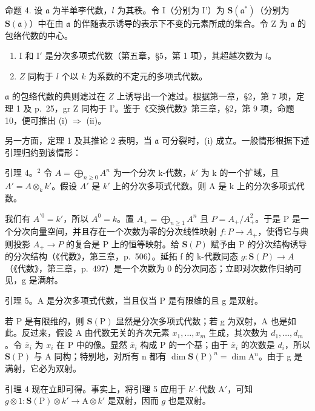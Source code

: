命题 4. 设 \(\mathfrak{a}\) 为半单李代数，\(l\) 为其秩。令 I（分别为 I'）为 \(\mathbf{S}(\mathfrak{a}^{*})\)（分别为 \(\mathbf{S}(\mathfrak{a})\)）中在由 \(\mathfrak{a}\) 的伴随表示诱导的表示下不变的元素所成的集合。令 Z 为 \(\mathfrak{a}\) 的包络代数的中心。

\begin{enumerate}
\def\labelenumi{(\roman{enumi})}
\item
  I 和 \(\mathrm{I}'\) 是分次多项式代数（第五章，§5，第 1 项），其超越次数为 \(l\)。
\item
  \(Z\) 同构于 \(l\) 个以 \(k\) 为系数的不定元的多项式代数。
\end{enumerate}

\(\mathfrak{a}\) 的包络代数的典则滤过在 \(Z\) 上诱导出一个滤过。根据第一章，§2，第 7 项，定理 1 及 p.~25，gr Z 同构于 I'。鉴于《交换代数》第三章，§2，第 9 项，命题 10，便可推出 (i) \(\Longrightarrow\) (ii)。

另一方面，定理 1 及其推论 2 表明，当 \(\mathfrak{a}\) 可分裂时，(i) 成立。一般情形根据下述引理归约到该情形：

引理 4。\(^{2}\) 令 \(A = \bigoplus_{n \geq 0} A^{n}\) 为一个分次 k-代数，\(k'\) 为 k 的一个扩域，且 \(A' = A \otimes_{k} k'\)。假设 \(A'\) 是 \(k'\) 上的分次多项式代数。则 A 是 k 上的分次多项式代数。

我们有 \(A^{\prime0}=k'\)，所以 \(A^{0}=k\)。置 \(A_{+}=\bigoplus_{n\geq1}A^{n}\) 且 \(P=A_{+}/A_{+}^{2}\)。于是 P 是一个分次向量空间，并且存在一个次数为零的分次线性映射 \(f:P\to A_{+}\)，使得它与典则投影 \(A_{+} \rightarrow P\) 的复合是 P 上的恒等映射。给 \(\mathbf{S}(P)\) 赋予由 P 的分次结构诱导的分次结构（《代数》，第三章，p.~506）。延拓 f 的 k-代数同态 \(g : \mathbf{S}(P) \rightarrow A\)（《代数》，第三章，p.~497）是一个次数为 0 的分次同态；立即对次数作归纳可见，g 是满射。

引理 5。A 是分次多项式代数，当且仅当 P 是有限维的且 g 是双射。

若 P 是有限维的，则 \(\mathbf{S}(\mathrm{P})\) 显然是分次多项式代数；若 g 为双射，A 也是如此。反过来，假设 A 由代数无关的齐次元素 \(x_{1},\ldots,x_{m}\) 生成，其次数为 \(d_{1},\ldots,d_{m}\)。令 \(\bar{x}_{i}\) 为 \(x_{i}\) 在 P 中的像。显然 \(\bar{x}_{i}\) 构成 P 的一个基；由于 \(\bar{x}_{i}\) 的次数是 \(d_{i}\)，所以 \(\mathbf{S}(\mathrm{P})\) 与 A 同构；特别地，对所有 n 都有 \(\dim\mathbf{S}(\mathrm{P})^{n}=\dim\mathrm{A}^{n}\)。由于 g 是满射，它必为双射。

引理 4 现在立即可得。事实上，将引理 5 应用于 \(k'\)-代数 \(\mathrm{A}'\)，可知 \(g \otimes 1: \mathbf{S}(\mathrm{P}) \otimes k' \to \mathrm{A} \otimes k'\) 是双射，因而 \(g\) 也是双射。

